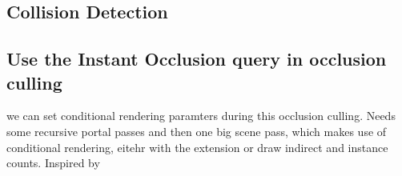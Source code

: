 \subsection{Collision Detection}
\subsection{Use the Instant Occlusion query in occlusion culling}
we can set conditional rendering paramters during this occlusion culling.
Needs some  recursive portal passes and then one big scene pass, which makes use of conditional rendering, eitehr with the extension or draw indirect and instance counts. Inspired by \cite{yang:2014:walkthrough}













